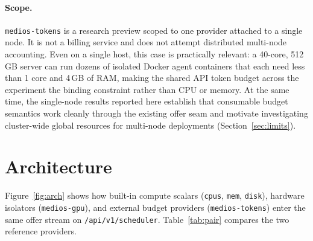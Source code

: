 \documentclass[11pt]{article}
\begin{document}
\paragraph{Scope.} \texttt{medios-tokens} is a research preview scoped to one provider attached to a single node. It is not a billing service and does not attempt distributed multi-node accounting. Even on a single host, this case is practically relevant: a 40-core, 512\,GB server can run dozens of isolated Docker agent containers that each need less than 1 core and 4\,GB of RAM, making the shared API token budget across the experiment the binding constraint rather than CPU or memory. At the same time, the single-node results reported here establish that consumable budget semantics work cleanly through the existing offer seam and motivate investigating cluster-wide global resources for multi-node deployments (Section~\ref{sec:limits}).

\section{Architecture}
\label{sec:arch}

Figure~\ref{fig:arch} shows how built-in compute scalars (\texttt{cpus}, \texttt{mem}, \texttt{disk}), hardware isolators (\texttt{medios-gpu}), and external budget providers (\texttt{medios-tokens}) enter the same offer stream on \texttt{/api/v1/scheduler}. Table~\ref{tab:pair} compares the two reference providers.
\end{document}
